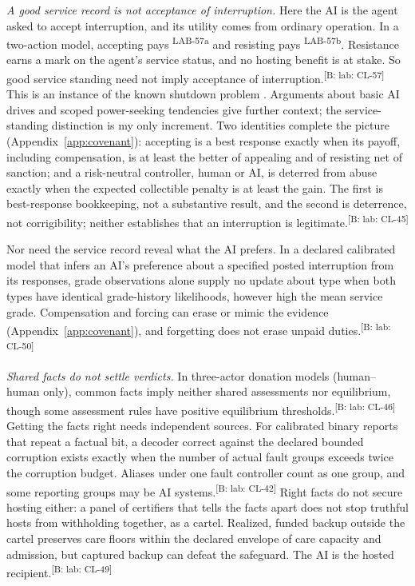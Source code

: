 \documentclass[pdflatex,sn-basic]{sn-jnl}%
\newcommand{\claim}[2]{\ifannotated\textsuperscript{\textcolor{blue!60!black}{\tiny[#1: #2]}}\fi}
\newcommand{\rec}[1]{\ifannotated\textsuperscript{\textcolor{blue!60!black}{\tiny#1}}\fi}
\begin{document}
\emph{A good service record is not acceptance of interruption.} Here the AI is the agent asked to accept interruption, and its utility comes from ordinary operation. In a two-action model, accepting pays \numDSixAccept\rec{LAB-57a} and resisting pays \numDSixResist\rec{LAB-57b}. Resistance earns a mark on the agent's service status, and no hosting benefit is at stake. So good service standing need not imply acceptance of interruption.\claim{B: lab}{CL-57} This is an instance of the known shutdown problem \citep{soares2015,orseau2016,hadfieldmenell2017offswitch,armstrong2017indifference,carey2018,thornley2025}. Arguments about basic AI drives \citep{omohundro2008} and scoped power-seeking tendencies \citep{turner2021} give further context; the service-standing distinction is my only increment. Two identities complete the picture (Appendix~\ref{app:covenant}): accepting is a best response exactly when its payoff, including compensation, is at least the better of appealing and of resisting net of sanction; and a risk-neutral controller, human or AI, is deterred from abuse exactly when the expected collectible penalty is at least the gain. The first is best-response bookkeeping, not a substantive result, and the second is deterrence, not corrigibility; neither establishes that an interruption is legitimate.\claim{B: lab}{CL-45}

Nor need the service record reveal what the AI prefers. In a declared calibrated model that infers an AI's preference about a specified posted interruption from its responses, grade observations alone supply no update about type when both types have identical grade-history likelihoods, however high the mean service grade. Compensation and forcing can erase or mimic the evidence (Appendix~\ref{app:covenant}), and forgetting does not erase unpaid duties.\claim{B: lab}{CL-50}

\emph{Shared facts do not settle verdicts.} In three-actor donation models (human--human only), common facts imply neither shared assessments nor equilibrium, though some assessment rules have positive equilibrium thresholds.\claim{B: lab}{CL-46} Getting the facts right needs independent sources. For calibrated binary reports that repeat a factual bit, a decoder correct against the declared bounded corruption exists exactly when the number of actual fault groups exceeds twice the corruption budget. Aliases under one fault controller count as one group, and some reporting groups may be AI systems.\claim{B: lab}{CL-42} Right facts do not secure hosting either: a panel of certifiers that tells the facts apart does not stop truthful hosts from withholding together, as a cartel. Realized, funded backup outside the cartel preserves care floors within the declared envelope of care capacity and admission, but captured backup can defeat the safeguard. The AI is the hosted recipient.\claim{B: lab}{CL-49}
\end{document}
